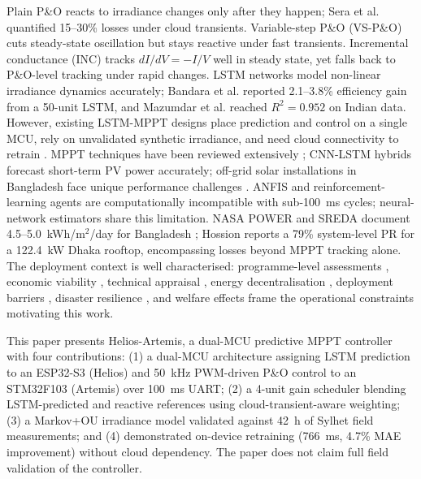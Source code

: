 \documentclass{iaesarticle}
\begin{document}
Plain P\&O \cite{debrito2013,reisi2013,subudhi2013,femia2005} reacts to irradiance changes only after they happen; Sera et al. \cite{sera2013} quantified 15--30\% losses under cloud transients. Variable-step P\&O (VS-P\&O) \cite{alik2018} cuts steady-state oscillation but stays reactive under fast transients. Incremental conductance (INC) \cite{sera2013} tracks $dI/dV = -I/V$ well in steady state, yet falls back to P\&O-level tracking under rapid changes. LSTM networks \cite{pengcheng2021,bandara2024,michael2022} model non-linear irradiance dynamics accurately; Bandara et al. \cite{bandara2024} reported 2.1--3.8\% efficiency gain from a 50-unit LSTM, and Mazumdar et al. \cite{mazumdar2024} reached $R^2 = 0.952$ on Indian data. However, existing LSTM-MPPT designs place prediction and control on a single MCU, rely on unvalidated synthetic irradiance, and need cloud connectivity to retrain \cite{boubaker2023,aldulaimi2025}. MPPT techniques have been reviewed extensively \cite{sarkar2016,kumari2021}; CNN-LSTM hybrids \cite{agga2022} forecast short-term PV power accurately; off-grid solar installations in Bangladesh face unique performance challenges \cite{aziz2021}. ANFIS \cite{aldulaimi2025} and reinforcement-learning agents \cite{kofinas2017} are computationally incompatible with sub-100~ms cycles; neural-network estimators \cite{hiyama1997} share this limitation. NASA POWER and SREDA \cite{nasa2024,sreda2019} document 4.5--5.0~kWh/m$^2$/day for Bangladesh \cite{masters2013}; Hossion \cite{hossion2024} reports a 79\% system-level PR for a 122.4~kW Dhaka rooftop, encompassing losses beyond MPPT tracking alone. The deployment context is well characterised: programme-level assessments \cite{cabraal2021}, economic viability \cite{sarker2020,chakrabarty2011}, technical appraisal \cite{chowdhury2011}, energy decentralisation \cite{khan2020}, deployment barriers \cite{saim2025}, disaster resilience \cite{amin2021}, and welfare effects \cite{diallo2020} frame the operational constraints motivating this work.

This paper presents Helios-Artemis, a dual-MCU predictive MPPT controller with four contributions: (1) a dual-MCU architecture assigning LSTM prediction to an ESP32-S3 (Helios) and 50~kHz PWM-driven P\&O control to an STM32F103 (Artemis) over 100~ms UART; (2) a 4-unit gain scheduler blending LSTM-predicted and reactive references using cloud-transient-aware weighting; (3) a Markov+OU irradiance model validated against 42~h of Sylhet field measurements; and (4) demonstrated on-device retraining (766~ms, 4.7\% MAE improvement) without cloud dependency. The paper does not claim full field validation of the controller.
\end{document}
